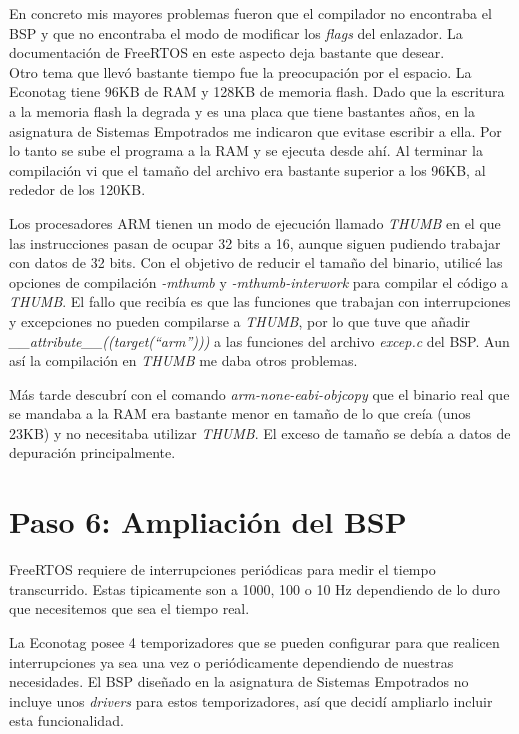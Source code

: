 En concreto mis mayores problemas fueron que el compilador no encontraba el BSP y que no encontraba el modo de modificar los \emph{flags} del enlazador.
La documentación de FreeRTOS en este aspecto deja bastante que desear.\\

Otro tema que llevó bastante tiempo fue la preocupación por el espacio. La Econotag tiene 96KB de RAM y 128KB de memoria flash. Dado que la escritura a la memoria flash la degrada y es una placa que tiene bastantes años, en la asignatura de Sistemas Empotrados me indicaron que evitase escribir a ella. Por lo tanto se sube el programa a la RAM y se ejecuta desde ahí. Al terminar la compilación vi que el tamaño del archivo era bastante superior a los 96KB, al rededor de los 120KB. 

Los procesadores ARM tienen un modo de ejecución llamado \emph{THUMB} en el que las instrucciones pasan de ocupar 32 bits a 16, aunque siguen pudiendo trabajar con datos de 32 bits. Con el objetivo de reducir el tamaño del binario, utilicé las opciones de compilación \emph{-mthumb} y \emph{-mthumb-interwork} para compilar el código a \emph{THUMB}. El fallo que recibía es que las funciones que trabajan con interrupciones y excepciones no pueden compilarse a \emph{THUMB}, por lo que tuve que añadir \emph{ \_\_attribute\_\_((target(``arm'')))} a las funciones del archivo \emph{excep.c} del BSP. Aun así la compilación en \emph{THUMB} me daba otros problemas.

Más tarde descubrí con el comando \emph{arm-none-eabi-objcopy} que el binario real que se mandaba a la RAM era bastante menor en tamaño de lo que creía (unos 23KB) y no necesitaba utilizar \emph{THUMB}. El exceso de tamaño se debía a datos de depuración principalmente.

\section{Paso 6: Ampliación del BSP}
FreeRTOS requiere de interrupciones periódicas para medir el tiempo transcurrido. Estas tipicamente son a 1000, 100 o 10 Hz dependiendo de lo duro que necesitemos que sea el tiempo real.

La Econotag posee 4 temporizadores que se pueden configurar para que realicen interrupciones ya sea una vez o periódicamente dependiendo de nuestras necesidades. El BSP diseñado en la asignatura de Sistemas Empotrados no incluye unos \emph{drivers} para estos temporizadores, así que decidí ampliarlo incluir esta funcionalidad.\\

